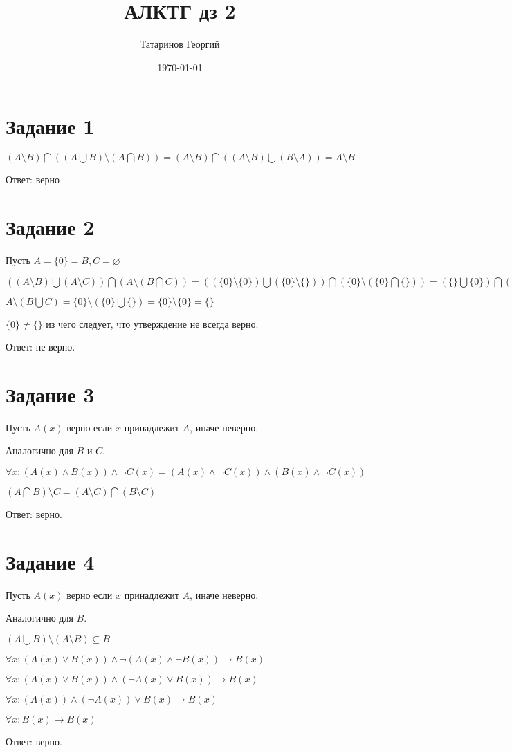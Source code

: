 \documentclass[a4paper, 12pt]{article}
\title{АЛКТГ дз 2}
\author{Татаринов Георгий}
\date{\today}
\begin{document}
	\maketitle
	\section*{Задание 1}
		$(A\setminus B)\bigcap((A\bigcup B)\setminus (A\bigcap B))=(A\setminus B)\bigcap((A\setminus B)\bigcup (B\setminus A))=A\setminus B$\par
		Ответ: верно
	\section*{Задание 2}
		Пусть $A=\{0\}=B,C=\varnothing$\par
		$((A\setminus B)\bigcup(A\setminus C))\bigcap (A\setminus (B\bigcap C))=
		((\{0\}\setminus \{0\})\bigcup(\{0\}\setminus \{\}))\bigcap (\{0\}\setminus (\{0\}\bigcap \{\}))
		=(\{\}\bigcup\{0\})\bigcap (\{0\}\setminus \{\})
		=\{0\}\bigcap \{0\}
		=\{0\}$\par
		$A\setminus (B\bigcup C)=\{0\}\setminus (\{0\}\bigcup \{\})=\{0\}\setminus \{0\}=\{\}$\par
		$\{0\}\neq\{\}$ из чего следует, что утверждение не всегда верно.\par
		Ответ: не верно.
	\section*{Задание 3}
		Пусть $A(x)$ верно если $x$ принадлежит $A$, иначе неверно.\par
		Аналогично для $B$ и $C$.\par
		$\forall x : (A(x)\land B(x)) \land \lnot C(x)  =  (A(x) \land \lnot C(x)) \land (B(x) \land \lnot C(x))$\par
		$(A\bigcap B)\setminus C  =  (A \setminus C) \bigcap (B \setminus C)$\par
		Ответ: верно.
	\section*{Задание 4}
		Пусть $A(x)$ верно если $x$ принадлежит $A$, иначе неверно.\par
		Аналогично для $B$.\par
		$(A\bigcup B) \setminus (A \setminus B) \subseteq B$\par
		$\forall x : (A(x)\lor B(x)) \land \lnot (A(x) \land \lnot B(x)) \to B(x)$\par
		$\forall x : (A(x)\lor B(x)) \land (\lnot A(x) \lor  B(x)) \to B(x)$\par
		$\forall x : (A(x)) \land (\lnot A(x)) \lor B(x) \to B(x)$\par
		$\forall x : B(x) \to B(x)$\par
		Ответ: верно.
\end{document}
